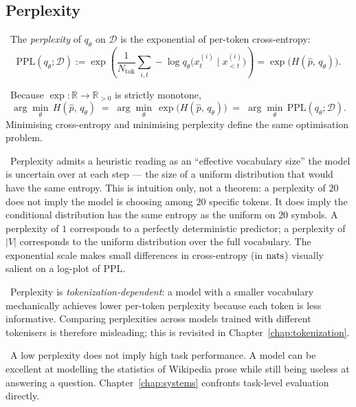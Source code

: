 \subsection{Perplexity}

\Def\ The \emph{perplexity} of $q_\theta$ on $\mathcal{D}$ is the
exponential of per-token cross-entropy:
\begin{equation}
\mathrm{PPL}(q_\theta; \mathcal{D})
  := \exp\!\left( \frac{1}{N_{\mathrm{tok}}} \sum_{i,t}
       -\log q_\theta\!\big(x^{(i)}_t \mid x^{(i)}_{<t}\big) \right)
  = \exp\!\big( H(\hat p,\, q_\theta) \big).
\label{eq:perplexity}
\end{equation}

\Ident\ Because $\exp : \mathbb{R} \to \mathbb{R}_{>0}$ is strictly
monotone,
\begin{equation}
\arg\min_\theta\, H(\hat p,\, q_\theta)
  \;=\; \arg\min_\theta\, \exp\!\big(H(\hat p,\, q_\theta)\big)
  \;=\; \arg\min_\theta\, \mathrm{PPL}(q_\theta; \mathcal{D}).
\label{eq:ppl-argmin}
\end{equation}
Minimising cross-entropy and minimising perplexity define the same
optimisation problem.

\Cons\ Perplexity admits a heuristic reading as an ``effective
vocabulary size'' the model is uncertain over at each step --- the
size of a uniform distribution that would have the same entropy.
This is intuition only, not a theorem: a perplexity of $20$ does
not imply the model is choosing among $20$ specific tokens. It does
imply the conditional distribution has the same entropy as the
uniform on $20$ symbols. A perplexity of $1$ corresponds to a
perfectly deterministic predictor; a perplexity of $|V|$ corresponds
to the uniform distribution over the full vocabulary. The
exponential scale makes small differences in cross-entropy (in $\mathrm{nats}$)
visually salient on a log-plot of PPL.

\Emp\ Perplexity is \emph{tokenization-dependent}: a model with a
smaller vocabulary mechanically achieves lower per-token perplexity
because each token is less informative. Comparing perplexities across
models trained with different tokenisers is therefore misleading; this
is revisited in Chapter~\ref{chap:tokenization}.

\Emp\ A low perplexity does not imply high task performance. A model
can be excellent at modelling the statistics of Wikipedia prose while
still being useless at answering a question. Chapter~\ref{chap:systems} confronts task-level
evaluation directly.

